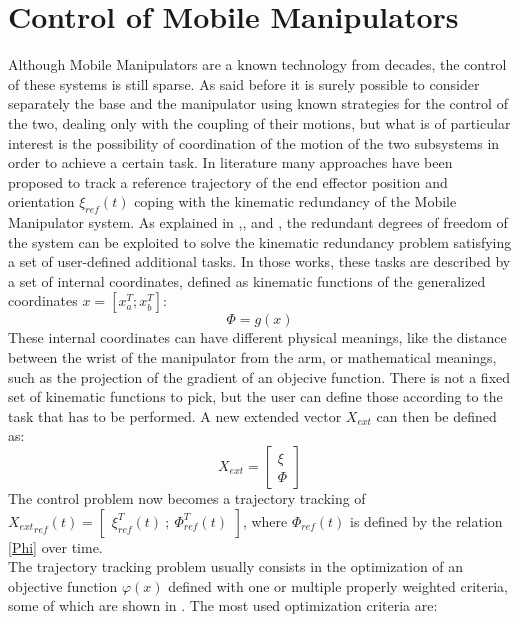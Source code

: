 \section{Control of Mobile Manipulators}
Although Mobile Manipulators are a known technology from decades, the control of these systems is still sparse. As said before it is surely possible to consider separately the base and the manipulator using known strategies for the control of the two, dealing only with the coupling of their motions, but what is of particular interest is the possibility of coordination of the motion of the two subsystems in order to achieve a certain task. In literature many approaches have been proposed to track a reference trajectory of the end effector position and orientation $\xi_{ref}(t)$ coping with the kinematic redundancy of the Mobile Manipulator system. As explained in \cite{bayle},\cite{seraji1998},\cite{seraji1993} and \cite{mikschschroeder}, the redundant degrees of freedom of the system can be exploited to solve the kinematic redundancy problem satisfying a set of user-defined additional tasks. In those works, these tasks are described by a set of internal coordinates, defined as kinematic functions of the generalized coordinates $x=\left[x_a^T ; x_b^T\right]$:
\begin{equation}\label{Phi}
	\Phi=g(x)
\end{equation}
These internal coordinates can have different physical meanings, like the distance between the wrist of the manipulator from the arm, or mathematical meanings, such as the projection of the gradient of an objecive function. There is not a fixed set of kinematic functions to pick, but the user can define those according to the task that has to be performed. A new extended vector $X_{ext}$ can then be defined as:
\begin{equation}
	X_{ext}=\left[\begin{matrix}
	\xi \\ \Phi
	\end{matrix}\right]
\end{equation}
The control problem now becomes a trajectory tracking of ${X_{ext}}_{ref}(t) =\left[\begin{matrix} \xi_{ref}^T(t) \ ;\ \Phi_{ref}^T(t) \end{matrix}\right]$, where $ \Phi_{ref}(t)$ is defined by the relation \ref{Phi} over time.\\
The trajectory tracking problem usually consists in the optimization of an objective function $\varphi(x)$ defined with one or multiple properly weighted criteria, some of which are shown in \cite{multicriteria}. The most used optimization criteria are: 
